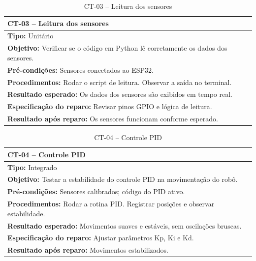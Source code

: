 
\begin{table}[H]
\centering
\begin{tabular}{|p{}|}
\hline
\textbf{CT-03 – Leitura dos sensores} \\ \hline
\textbf{Tipo:} Unitário \\ \hline
\textbf{Objetivo:} Verificar se o código em Python lê corretamente os dados dos sensores. \\ \hline
\textbf{Pré-condições:} Sensores conectados ao ESP32. \\ \hline
\textbf{Procedimentos:} Rodar o script de leitura. Observar a saída no terminal. \\ \hline
\textbf{Resultado esperado:} Os dados dos sensores são exibidos em tempo real. \\ \hline
\textbf{Especificação do reparo:} Revisar pinos GPIO e lógica de leitura. \\ \hline
\textbf{Resultado após reparo:} Os sensores funcionam conforme esperado. \\ \hline
\end{tabular}
\caption{CT-03 – Leitura dos sensores}
\end{table}


\begin{table}[H]
\centering
\begin{tabular}{|p{}|}
\hline
\textbf{CT-04 – Controle PID} \\ \hline
\textbf{Tipo:} Integrado \\ \hline
\textbf{Objetivo:} Testar a estabilidade do controle PID na movimentação do robô. \\ \hline
\textbf{Pré-condições:} Sensores calibrados; código do PID ativo. \\ \hline
\textbf{Procedimentos:} Rodar a rotina PID. Registrar posições e observar estabilidade. \\ \hline
\textbf{Resultado esperado:} Movimentos suaves e estáveis, sem oscilações bruscas. \\ \hline
\textbf{Especificação do reparo:} Ajustar parâmetros Kp, Ki e Kd. \\ \hline
\textbf{Resultado após reparo:} Movimentos estabilizados. \\ \hline
\end{tabular}
\caption{CT-04 – Controle PID}
\end{table}

